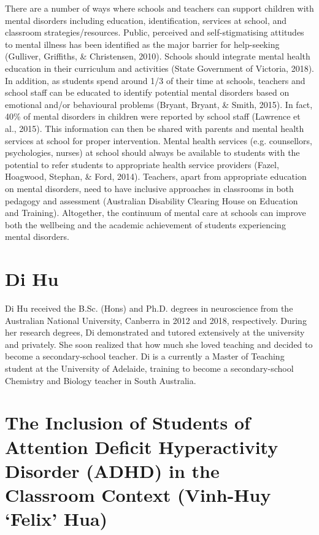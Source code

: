 \documentclass[twoside,14pt,a4paper,notitlepage]{memoir}
\begin{document}
There are a number of ways where schools and teachers can support children with mental disorders including education, identification, services at school, and classroom strategies/resources. Public, perceived and self-stigmatising attitudes to mental illness has been identified as the major barrier for help-seeking (Gulliver, Griffiths, \& Christensen, 2010). Schools should integrate mental health education in their curriculum and activities (State Government of Victoria, 2018). In addition, as students spend around 1/3 of their time at schools, teachers and school staff can be educated to identify potential mental disorders based on emotional and/or behavioural problems (Bryant, Bryant, \& Smith, 2015). In fact, 40\% of mental disorders in children were reported by school staff (Lawrence et al., 2015). This information can then be shared with parents and mental health services at school for proper intervention. Mental health services (e.g. counsellors, psychologies, nurses) at school should always be available to students with the potential to refer students to appropriate health service providers (Fazel, Hoagwood, Stephan, \& Ford, 2014). Teachers, apart from appropriate education on mental disorders, need to have inclusive approaches in classrooms in both pedagogy and assessment (Australian Disability Clearing House on Education and Training). Altogether, the continuum of mental care at schools can improve both the wellbeing and the academic achievement of students experiencing mental disorders.

\section*{Di Hu}

Di Hu received the B.Sc. (Hons) and Ph.D. degrees in neuroscience from the
Australian National University, Canberra in 2012 and 2018,
respectively. During her research degrees, Di demonstrated and tutored
extensively at the university and privately. She soon realized that how much
she loved teaching and decided to become a secondary-school teacher.
Di is a currently a Master of Teaching student at the University of Adelaide,
training to become a secondary-school Chemistry and Biology teacher in South
Australia.



\section*{The Inclusion of Students of Attention Deficit Hyperactivity Disorder (ADHD) in the Classroom Context (Vinh-Huy `Felix' Hua)}
\label{aut:hua}
\end{document}
